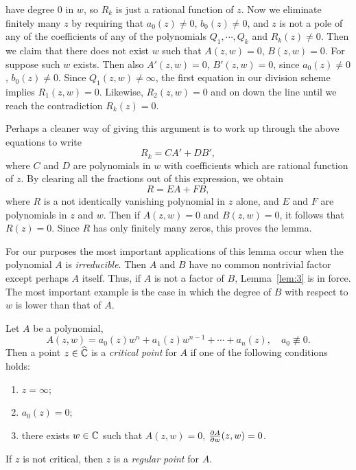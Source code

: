 \documentclass[a4paper,11pt]{article}
\begin{document}
\begin{myproof}
  have degree 0 in $w$, so $R_k$ is just a rational function of $z$.
  Now we eliminate finitely many $z$ by requiring that $a_0(z) \ne 0$,
  $b_0(z) \ne 0$, and $z$ is not a pole of any of the coefficients of
  any of the polynomials $Q_1, \cdots, Q_k$ and $R_k(z) \ne 0$.  Then
  we claim that there does not exist $w$ such that $A(z,w) = 0$,
  $B(z,w) = 0$.  For suppose such $w$ exists.  Then also $A'(z,w) =
  0$, $B'(z,w) = 0$, since $a_0(z) \ne 0$, $b_0(z) \ne 0$.  Since
  $Q_1(z,w) \ne \infty$, the first equation in our division scheme
  implies $R_1(z,w) = 0$.  Likewise, $R_2(z,w) = 0$ and on down the
  line until we reach the contradiction $R_k(z) = 0$.
\end{myproof}

\begin{rem}
  Perhaps a cleaner way of giving this argument is to work up through
  the above equations to write
  $$
  R_k = CA' + DB',
  $$
  where $C$ and $D$ are polynomials in $w$ with coefficients which are
  rational function of $z$.  By clearing all the fractions out of this
  expression, we obtain
  $$
  R = EA + FB,
  $$
  where $R$ is a not identically vanishing polynomial in $z$ alone,
  and $E$ and $F$ are polynomials in $z$ and $w$.  Then if $A(z,w) =
  0$ and $B(z,w) = 0$, it follows that $R(z) = 0$.  Since $R$ has only
  finitely many zeros, this proves the lemma.
\end{rem}

For our purposes the most important applications of this lemma occur
when the polynomial $A$ is \emph{irreducible}.  Then $A$ and $B$ have
no common nontrivial factor except perhaps $A$ itself.  Thus, if $A$
is not a factor of $B$, Lemma~\ref{lem:3} is in force.  The most
important example is the case in which the degree of $B$ with respect
to $w$ is lower than that of $A$.

\begin{defn}
  \label{def:1}
  Let $A$ be a polynomial,
  $$
  A(z,w) = a_0(z) w^n + a_1(z) w^{n-1} + \cdots + a_n(z),\quad
  a_0 \not\equiv 0.
  $$
  Then a point $z \in \widehat{{\mathbb C}}$ is a \emph{critical point} for
  $A$ if one of the following conditions holds:
  \begin{enumerate}
  \item $z = \infty$;
  \item $a_0(z) = 0$;
  \item there exists $w \in {\mathbb C}$ such that $A(z,w) =0$, $\frac{\partial
      A}{\partial w}(z,w) =0$.
  \end{enumerate}
  If $z$ is not critical, then $z$ is a \emph{regular point} for $A$.
\end{defn}
\end{document}

